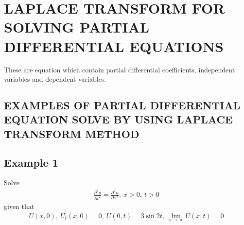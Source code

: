 \documentclass[11pt]{report}
\begin{document}
	
	\section{LAPLACE TRANSFORM FOR SOLVING PARTIAL DIFFERENTIAL EQUATIONS}
	These are equation which contain partial differential coefficients, independent variables and dependent variables.
	
	\subsection{EXAMPLES OF PARTIAL DIFFERENTIAL EQUATION SOLVE BY USING LAPLACE TRANSFORM METHOD}

	\subsection*{Example 1}
	Solve
	\begin{eqnarray}
		\frac{\partial^2 u}{\partial t^2} = \frac{\partial^2 u}{\partial x^2}, ~ x > 0, ~ t > 0 \label{eq:3_7}
	\end{eqnarray}
	given that
	\begin{eqnarray}
		U(x,0),~ U_t(x,0) = 0, ~ U(0,t)=3\sin 2t,~ \lim\limits_{x\rightarrow\infty}U(x,t) = 0\label{eq:3_8}
	\end{eqnarray}
\end{document}
